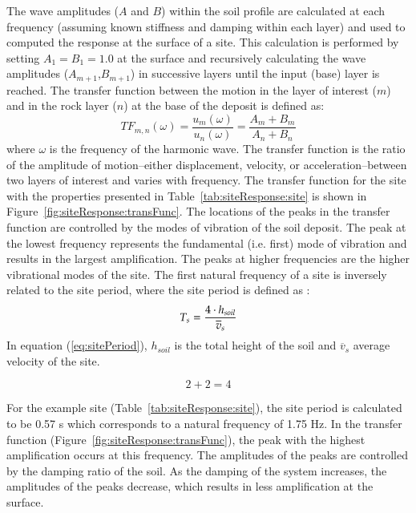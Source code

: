 \documentclass[11pt]{report}
\begin{document}
The wave amplitudes ($A$ and $B$) within the soil profile are calculated at each frequency (assuming
known stiffness and damping within each layer) and used to computed the response at the surface of a
site.  This calculation is performed by setting $A_{1}=B_{1}=1.0$ at the surface and recursively
calculating the wave amplitudes ($A_{m+1}$,$B_{m+1}$) in successive layers until the input (base)
layer is reached.  The transfer function between the motion in the layer of interest ($m$) and in
the rock layer ($n$) at the base of the deposit is defined as:
\begin{equation}
  TF_{m,n}(\omega) = \frac{u_m(\omega)}{u_n(\omega)}= \frac{A_m + B_m}{A_n + B_n}
  \label{eq:transFunc}
\end{equation}
where $\omega$ is the frequency of the harmonic wave.  The transfer function is the ratio of the
amplitude of motion--either displacement, velocity, or acceleration--between two layers of interest
and varies with frequency.  The transfer function for the site with the properties presented in
Table~\ref{tab:siteResponse:site} is shown in Figure~\ref{fig:siteResponse:transFunc}.  The locations of the
peaks in the transfer function are controlled by the modes of vibration of the soil deposit.  The
peak at the lowest frequency represents the fundamental (i.e. first) mode of vibration and results
in the largest amplification.  The peaks at higher frequencies are the higher vibrational modes of
the site.  The first natural frequency of a site is inversely related to the site period, where the
site period is defined as \citep{kramer:96}:
\begin{equation}
  T_s = \frac{4\cdot h_{soil}}{\overline{v}_s}\\ 
  \label{eq:sitePeriod}
\end{equation}
In equation (\ref{eq:sitePeriod}), $h_{soil}$ is the total height of the soil and $\overline{v}_s$
average velocity of the site.  

\begin{equation}
	2+2=4
  \label{eq:avgVs}
\end{equation}

For the example site (Table~\ref{tab:siteResponse:site}), the site period is calculated to be 0.57 s
which corresponds to a natural frequency of 1.75 Hz.  In the transfer function
(Figure~\ref{fig:siteResponse:transFunc}), the peak with the highest amplification occurs
at this frequency.  The amplitudes of the peaks are controlled by the damping ratio of the soil. As
the damping of the system increases, the amplitudes of the peaks decrease, which results in less
amplification at the surface.
\end{document}
